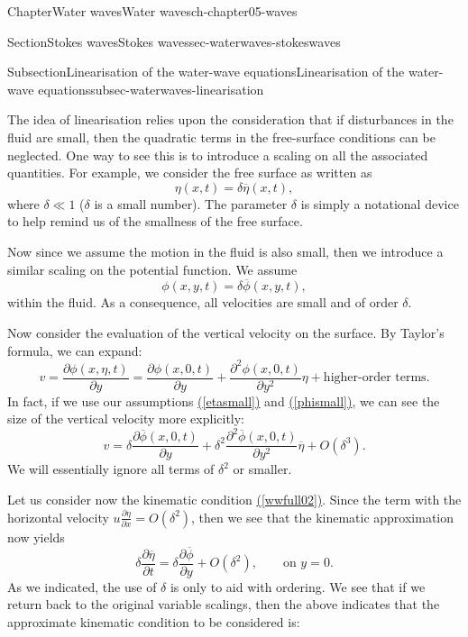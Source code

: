 \documentclass[oneside,10pt,]{book}
\newcommand{\xreffont}{\relax}
\numberwithin{equation}{section}
\newcommand{\pd}[2]{\frac{\partial#1}{\partial#2}}
\begin{document}
\begin{chapterptx}{Chapter}{Water waves}{}{Water waves}{}{}{ch-chapter05-waves}
\begin{sectionptx}{Section}{Stokes waves}{}{Stokes waves}{}{}{sec-waterwaves-stokeswaves}
\begin{subsectionptx}{Subsection}{Linearisation of the water-wave equations}{}{Linearisation of the water-wave equations}{}{}{subsec-waterwaves-linearisation}
\par
The idea of linearisation relies upon the consideration that if disturbances in the fluid are small, then the quadratic terms in the free-surface conditions can be neglected. One way to see this is to introduce a scaling on all the associated quantities. For example, we consider the free surface as written as%
\begin{equation}
\eta(x, t) = \delta \overline{\eta}(x, t), \label{etasmall}
\end{equation}
where \(\delta \ll 1\) (\(\delta\) is a small number). The parameter \(\delta\) is simply a notational device to help remind us of the smallness of the free surface.%
\par
Now since we assume the motion in the fluid is also small, then we introduce a similar scaling on the potential function. We assume%
\begin{equation}
\phi(x, y, t) = \delta \overline{\phi}(x, y, t), \label{phismall}
\end{equation}
within the fluid. As a consequence, all velocities are small and of order \(\delta\).%
\par
Now consider the evaluation of the vertical velocity on the surface. By Taylor's formula, we can expand:%
\begin{equation*}
v = \pd{\phi(x, \eta, t) }{y}= \pd{\phi(x, 0, t)}{y} + \pd{^2\phi(x, 0, t)}{y^2} \eta + \text{higher-order terms}.
\end{equation*}
In fact, if we use our assumptions \hyperref[etasmall]{({\xreffont\ref{etasmall}})} and \hyperref[phismall]{({\xreffont\ref{phismall}})}, we can see the size of the vertical velocity more explicitly:%
\begin{equation*}
v = \delta \pd{\overline{\phi}(x, 0, t)}{y} + \delta^2 \pd{^2\overline{\phi}(x, 0, t)}{y^2} \overline{\eta} + O(\delta^3).
\end{equation*}
We will essentially ignore all terms of \(\delta^2\) or smaller.%
\par
Let us consider now the kinematic condition \hyperref[wwfull02]{({\xreffont\ref{wwfull02}})}. Since the term with the horizontal velocity \(u \pd{\eta}{x} = O(\delta^2)\), then we see that the kinematic approximation now yields%
\begin{equation*}
\delta\pd{\overline{\eta}}{t} = \delta \pd{\overline{\phi}}{y} + O(\delta^2), \qquad \text{on $y = 0$}.
\end{equation*}
As we indicated, the use of \(\delta\) is only to aid with ordering. We see that if we return back to the original variable scalings, then the above indicates that the approximate kinematic condition to be considered is:%

\end{subsectionptx}
\end{sectionptx}
\end{chapterptx}
\end{document}
